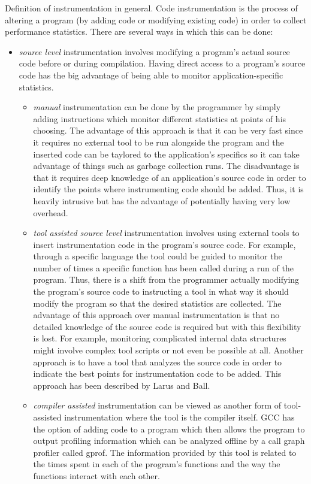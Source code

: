 Definition of instrumentation in general.
Code instrumentation is the process of altering a program (by adding code or modifying existing code) in order to collect performance statistics. There are several ways in which this can be done:
\begin{itemize}
\item \textit{source level} instrumentation involves modifying a program's actual source code before or during compilation. Having direct access to a program's source code has the big advantage of being able to monitor application-specific statistics.
\begin{itemize}
\item \textit{manual} instrumentation can be done by the programmer by simply adding instructions which monitor different statistics at points of his choosing. The advantage of this approach is that it can be very fast since it requires no external tool to be run alongside the program and the inserted code can be taylored to the application's specifics so it can take advantage of things such as garbage collection runs. The disadvantage is that it requires deep knowledge of an application's source code in order to identify the points where instrumenting code should be added. Thus, it is heavily intrusive but has the advantage of potentially having very low overhead.
\item \textit{tool assisted source level} instrumentation involves using external tools to insert instrumentation code in the program's source code. For example, through a specific language the tool could be guided to monitor the number of times a specific function has been called during a run of the program. Thus, there is a shift from the programmer actually modifying the program's source code to instructing a tool in what way it should modify the program so that the desired statistics are collected. The advantage of this approach over manual instrumentation is that no detailed knowledge of the source code is required but with this flexibility is lost. For example, monitoring complicated internal data structures might involve complex tool scripts or not even be possible at all. Another approach is to have a tool that analyzes the source code in order to indicate the best points for instrumentation code to be added. This approach has been described by Larus and Ball\cite{Ball94}.
\item \textit{compiler assisted} instrumentation can be viewed as another form of tool-assisted instrumentation where the tool is the compiler itself. GCC has the option of adding code to a program which then allows the program to output profiling information which can be analyzed offline by a call graph profiler called gprof\cite{Graham04}. The information provided by this tool is related to the times spent in each of the program's functions and the way the functions interact with each other.

\end{itemize}
\end{itemize}
